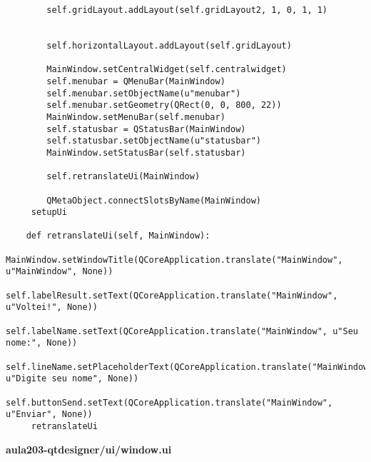 \documentclass[12pt,a4paper]{article}
\begin{document}
\begin{lstlisting}
        self.gridLayout.addLayout(self.gridLayout2, 1, 0, 1, 1)


        self.horizontalLayout.addLayout(self.gridLayout)

        MainWindow.setCentralWidget(self.centralwidget)
        self.menubar = QMenuBar(MainWindow)
        self.menubar.setObjectName(u"menubar")
        self.menubar.setGeometry(QRect(0, 0, 800, 22))
        MainWindow.setMenuBar(self.menubar)
        self.statusbar = QStatusBar(MainWindow)
        self.statusbar.setObjectName(u"statusbar")
        MainWindow.setStatusBar(self.statusbar)

        self.retranslateUi(MainWindow)

        QMetaObject.connectSlotsByName(MainWindow)
     setupUi

    def retranslateUi(self, MainWindow):
        MainWindow.setWindowTitle(QCoreApplication.translate("MainWindow", u"MainWindow", None))
        self.labelResult.setText(QCoreApplication.translate("MainWindow", u"Voltei!", None))
        self.labelName.setText(QCoreApplication.translate("MainWindow", u"Seu nome:", None))
        self.lineName.setPlaceholderText(QCoreApplication.translate("MainWindow", u"Digite seu nome", None))
        self.buttonSend.setText(QCoreApplication.translate("MainWindow", u"Enviar", None))
     retranslateUi
        \end{lstlisting}
        \textbf{aula203-qtdesigner/ui/window.ui}
\end{document}

